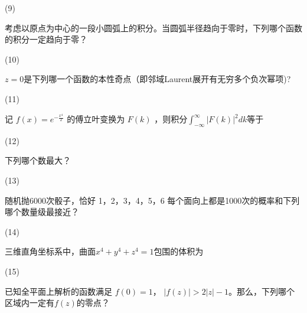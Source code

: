 \documentclass[12pt,CJK]{article}
\begin{document}
{{    }

\item[(9)]{ 考虑以原点为中心的一段小圆弧上的积分。当圆弧半径趋向于零时，下列哪个函数的积分一定趋向于零？  \bropt

    }

\item[(10)]{$z=0$是下列哪一个函数的本性奇点（即邻域Laurent展开有无穷多个负次幂项)? \bropt

   }
  
\item[(11)]{ 记 $f(x)=e^{-\frac{x^4}{2}}$ 的傅立叶变换为 $F(k)$ ，则积分$\int_{-\infty}^{\infty} |F(k)|^2 dk$等于 \bropt

  }
\item[(12)]{ 下列哪个数最大？ \bropt

    }
\item[(13)]{随机抛6000次骰子，恰好 1，2，3，4，5，6 每个面向上都是1000次的概率和下列哪个数量级最接近？ \bropt

  }

\item[(14)]{三维直角坐标系中，曲面$x^4+y^4+z^4=1$包围的体积为  \bropt

  }

\item[(15)]{已知全平面上解析的函数满足 $f(0) = 1$， $ |f(z)| > 2|z|-1 $。那么，下列哪个区域内一定有$f(z)$的零点？ \bropt

   }
  
  \eitem
{\vskip 0.5in}
  }
\end{document}
